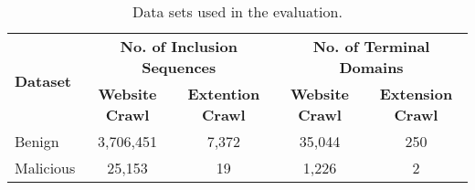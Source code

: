 \begin{table}[t]
    \centering
    \footnotesize
    \begin{tabular}{lcccc}
    \toprule
    \multirow{2}{*}{\textbf{Dataset}} & \multicolumn{2}{c}{\textbf{No. of Inclusion Sequences}} & \multicolumn{2}{c}{\textbf{No. of Terminal Domains}} \\
    \cmidrule[0.5pt](ll){2-3}
    \cmidrule[0.5pt](ll){4-5}
    & \textbf{Website Crawl} & \textbf{Extention Crawl} & \textbf{Website Crawl} & \textbf{Extension Crawl} \\
    \midrule
    Benign & 3,706,451 & 7,372 & 35,044 & 250 \\
    Malicious & 25,153 & 19 & 1,226 & 2 \\
    \bottomrule
    \end{tabular}
    \caption{Data sets used in the evaluation.}
    \label{inclusion:tab:dataset_statistics}
\end{table}
